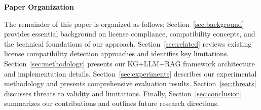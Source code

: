 \textbf{Paper Organization}

The remainder of this paper is organized as follows: Section~\ref{sec:background} provides essential background on license compliance, compatibility concepts, and the technical foundations of our approach. Section~\ref{sec:related} reviews existing license compatibility detection approaches and identifies key limitations. Section~\ref{sec:methodology} presents our KG+LLM+RAG framework architecture and implementation details. Section~\ref{sec:experiments} describes our experimental methodology and presents comprehensive evaluation results. Section~\ref{sec:threats} discusses threats to validity and limitations. Finally, Section~\ref{sec:conclusion} summarizes our contributions and outlines future research directions. 